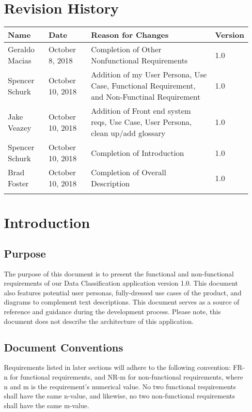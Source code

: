 \documentclass[12pt,oneside,letterpaper]{article}
\begin{document}
\section*{Revision History}
\begin{tabular}{|l|l|p{2.5in}|l|}
\hline
\textbf{Name}&\textbf{Date}&\textbf{Reason for Changes}&\textbf{Version}\\
\hline
Geraldo Macias&October 8, 2018&Completion of Other Nonfunctional Requirements&1.0\\
\hline
Spencer Schurk&October 10, 2018&Addition of my User Persona, Use Case, Functional Requirement, and Non-Functinal Requirement&1.0\\
\hline
Jake Veazey&October 10, 2018&Addition of Front end system reqs, Use Case, User Persona, clean up/add glossary&1.0\\
\hline
Spencer Schurk&October 10, 2018&Completion of Introduction&1.0\\
\hline
Brad Foster&October 10, 2018&Completion of Overall Description&1.0\\
\hline
&&&\\
\hline
\end{tabular}

\newpage

\section{Introduction}
\subsection{Purpose}
The purpose of this document is to present the functional and non-functional requirements of our Data Classification application version 1.0. This document also features potential user personas, fully-dressed use cases of the product, and diagrams to complement text descriptions. This document serves as a source of reference and guidance during the development process. Please note, this document does not describe the architecture of this application.

\subsection{Document Conventions}
Requirements listed in later sections will adhere to the following convention: FR-n for functional requirements, and NR-m for non-functional requirements, where n and m is the requirement's numerical value. No two functional requirements shall have the same n-value, and likewise, no two non-functional requirements shall have the same m-value.
\end{document}
